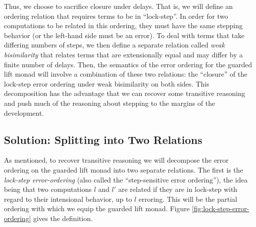 Thus, we choose to sacrifice closure under delays. That is, we will define an
ordering relation that requires terms to be in ``lock-step''. In order for two
computations to be related in this ordering, they must have the same stepping
behavior (or the left-hand side must be an error). To deal with terms that take
differing numbers of steps, we then define a separate relation called \emph{weak
bisimilarity} that relates terms that are extensionally equal and may differ by
a finite number of delays. Then, the semantics of the error ordering for the
guarded lift monad will involve a combination of these two relations: the
``closure'' of the lock-step error ordering under weak bisimilarity on both
sides.
This decomposition has the advantage that we can recover some transitive
reasoning and push much of the reasoning about stepping to the margins of the
development.


\subsection{Solution: Splitting into Two Relations}

As mentioned, to recover transitive reasoning we will decompose the error
ordering on the guarded lift monad into two separate relations. The first is the
\emph{lock-step error-ordering} (also called the ``step-sensitive error
ordering''), the idea being that two computations $l$ and $l'$ are related if
they are in lock-step with regard to their intensional behavior, up to $l$
erroring. This will be the partial ordering with which we equip the guarded lift monad.
Figure \ref{fig:lock-step-error-ordering} gives the definition.

